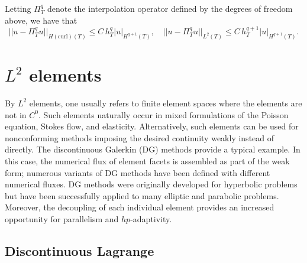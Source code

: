 Letting $\Pi_T^q$ denote the interpolation operator defined by the
degrees of freedom above, we have that \citep[Proposition 3]{Nedelec1986}
\begin{equation}
  ||u - \Pi_T^q u||_{H(\mathrm{curl})(T)} \leqslant C \, h_T^{q} |u|_{H^{q+1}(T)}, \quad
  ||u - \Pi_T^q u||_{L^2(T)} \leqslant C \, h_T^{q+1} |u|_{H^{q+1}(T)}.
\end{equation}

\section{$L^2$ elements}

By $L^2$ elements, one usually refers to finite element spaces where
the elements are not in $C^0$. Such elements naturally occur in mixed
formulations of the Poisson equation, Stokes flow, and
elasticity. Alternatively, such elements can be used for nonconforming
methods imposing\vadjust{\pagebreak} the desired \hbox{continuity} weakly instead of
directly. The discontinuous Galerkin (DG) methods provide a typical
example. In this case, the numerical flux of element facets is
assembled as part of the weak form; numerous variants of DG methods
have been defined with different numerical fluxes. DG methods were
originally developed for hyperbolic problems but have been
successfully applied to many elliptic and parabolic
problems. Moreover, the decoupling of each individual element provides
an increased opportunity for parallelism and $hp$-adaptivity.

\subsection{Discontinuous Lagrange}

